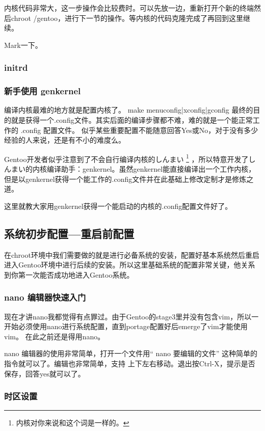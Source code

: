 \documentclass[amstex,twoside]{ctexbook}
\begin{document}
内核代码非常大，这一步操作会比较费时。可以先放一边，重新打开个新的终端然后chroot /gentoo，进行下一节的操作。等内核的代码克隆完成了再回到这里继续。

Mark一下。

\subsubsection{initrd}\label{sec:initrd}

\subsubsection{新手使用 genkernel}

编译内核最难的地方就是配置内核了。 make menuconfig|xconfig|gconfig 最终的目的就是获得一个.config文件。其实后面的编译步骤都不难，难的就是一个能正常工作的 .config 配置文件。
似乎某些重要配置不能随意回答Yes或No，对于没有多少经验的人来说，还是有不小的难度么。

Gentoo开发者似乎注意到了不会自行编译内核的しんまい%
\footnote{内核对你来说和这个词是一样的。}%
，所以特意开发了しんまい的内核编译助手：genkernel。虽然genkernel能直接编译出一个工作内核，
但是以genkernel获得一个能工作的.config文件并在此基础上修改定制才是修炼之道。

这里就教大家用genkernel获得一个能启动的内核的.config配置文件好了。


\subsection{系统初步配置—重启前配置}
在chroot环境中我们需要做的就是进行必备系统的安装，配置好基本系统然后重启进入Gentoo环境中进行后续的安装。所以这里基础系统的配置非常关键，他关系到你第一次能否成功地进入Gentoo系统。


\subsubsection{nano 编辑器快速入门}\label{sec:nano}
现在才讲nano我都觉得有点罪过。由于Gentoo的stage3里并没有包含vim，所以一开始必须使用nano进行系统配置，直到portage配置好后emerge了vim才能使用vim。
在此之前还是得用nano。

nano 编辑器的使用非常简单，打开一个文件用“ nano 要编辑的文件” 这种简单的指令就可以了。编辑也非常简单，支持
\textuparrow \textdownarrow \textleftarrow \textrightarrow 上下左右移动。退出按Ctrl-X，提示是否保存，回答yes就可以了。


\subsubsection{时区设置}
\end{document}
